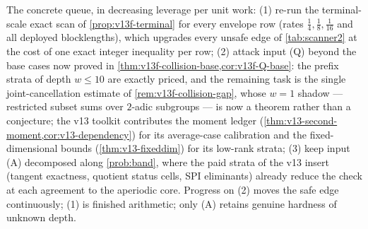 \begin{remark}\label{rem:v13f-next}
The concrete queue, in decreasing leverage per unit work: \textup{(1)} re-run the terminal-scale exact scan of \cref{prop:v13f-terminal} for every envelope row \textup(rates $\tfrac14,\tfrac18,\tfrac1{16}$ and all deployed blocklengths\textup), which upgrades every unsafe edge of \cref{tab:scanner2} at the cost of one exact integer inequality per row; \textup{(2)} attack input \textup{(Q)} beyond the base cases now proved in \cref{thm:v13f-collision-base,cor:v13f-Q-base}: the prefix strata of depth $w\le10$ are exactly priced, and the remaining task is the single joint-cancellation estimate of \cref{rem:v13f-collision-gap}, whose $w=1$ shadow --- restricted subset sums over $2$-adic subgroups --- is now a theorem rather than a conjecture; the v13 toolkit contributes the moment ledger \textup(\cref{thm:v13-second-moment,cor:v13-dependency}\textup) for its average-case calibration and the fixed-dimensional bounds \textup(\cref{thm:v13-fixeddim}\textup) for its low-rank strata; \textup{(3)} keep input \textup{(A)} decomposed along \cref{prob:band}, where the paid strata of the v13 insert \textup(tangent exactness, quotient status cells, SPI eliminants\textup) already reduce the check at each agreement to the aperiodic core.  Progress on \textup{(2)} moves the safe edge continuously; \textup{(1)} is finished arithmetic; only \textup{(A)} retains genuine hardness of unknown depth.
\end{remark}

